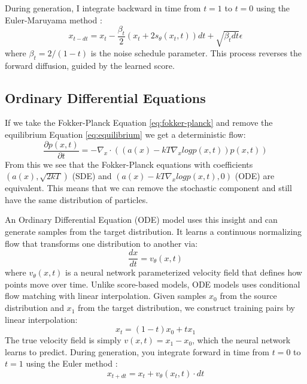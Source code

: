 \documentclass[conference,a4paper]{IEEEtran}
\begin{document}
During generation, I integrate backward in time from $t=1$ to $t=0$ using the Euler-Maruyama method \cite{burdenNumericalAnalysis2016}:
\begin{equation}
    x_{t-dt} = x_t - \frac{\beta_t}{2}(x_t + 2s_\theta(x_t, t))dt + \sqrt{\beta_t dt}\epsilon
\end{equation}
where $\beta_t = 2/(1-t)$ is the noise schedule parameter. This process reverses the forward diffusion, guided by the learned score.

\subsection{Ordinary Differential Equations}

If we take the Fokker-Planck Equation \ref{eq:fokker-planck} and remove the equilibrium Equation \ref{eq:equilibrium} we get a deterministic flow:
\begin{equation}
    \frac{\partial p(x, t)}{\partial t} = -\nabla_x \cdot ((a(x)-kT \nabla_x log p(x,t))p(x, t))
\end{equation}
From this we see that the Fokker-Planck equations with coefficients $(a(x), \sqrt{2kT})$ (SDE) and $(a(x)-kT \nabla_x log p(x,t), 0)$ (ODE) are equivalent. This means that we can remove the stochastic component and still have the same distribution of particles.

An Ordinary Differential Equation (ODE) model \cite{lipmanFlowMatchingGenerative2023} uses this insight and can generate samples from the target distribution. It learns a continuous normalizing flow that transforms one distribution to another via:
\begin{equation}
    \frac{dx}{dt} = v_\theta(x, t)
\end{equation}
where $v_\theta(x, t)$ is a neural network parameterized velocity field that defines how points move over time.
Unlike score-based models, ODE models uses conditional flow matching with linear interpolation. Given samples $x_0$ from the source distribution and $x_1$ from the target distribution, we construct training pairs by linear interpolation:
\begin{equation}
    x_t = (1-t)x_0 + tx_1
\end{equation}
The true velocity field is simply $v(x, t) = x_1 - x_0$, which the neural network learns to predict.
During generation, you integrate forward in time from $t=0$ to $t=1$ using the Euler method \cite{burdenNumericalAnalysis2016}:
\begin{equation}
    x_{t+dt} = x_t + v_\theta(x_t, t) \cdot dt
\end{equation}
\end{document}
